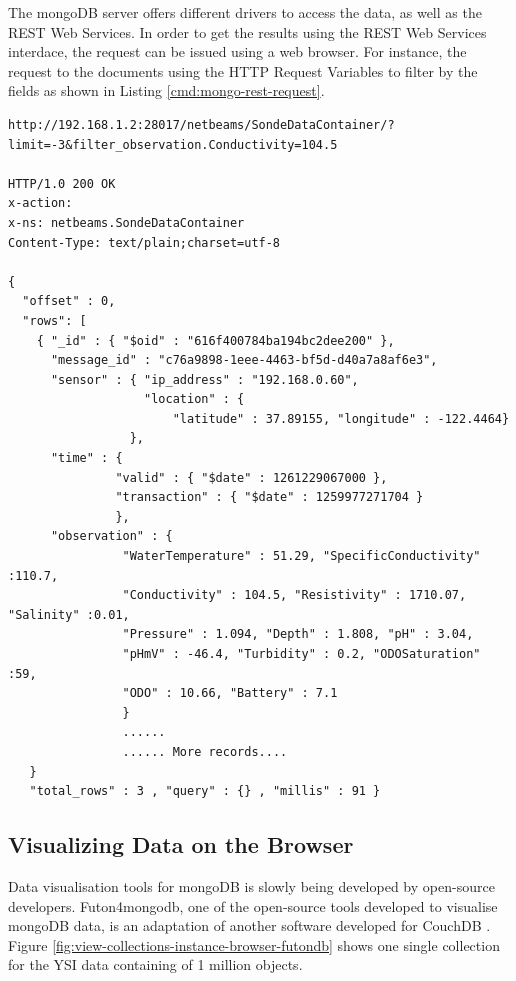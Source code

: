 The mongoDB server offers different drivers to access the data, as well as the
REST Web Services. In order to get the results using the REST Web Services
interdace, the request can be issued using a web browser. For instance, the
request to the documents using the HTTP Request Variables to filter by the
fields as shown in Listing \ref{cmd:mongo-rest-request}.

\lstset{label=cmd:mongo-rest-request,caption=REST HTTP Interface Example}
\begin{lstlisting}
http://192.168.1.2:28017/netbeams/SondeDataContainer/?limit=-3&filter_observation.Conductivity=104.5

HTTP/1.0 200 OK
x-action:
x-ns: netbeams.SondeDataContainer
Content-Type: text/plain;charset=utf-8

{
  "offset" : 0,
  "rows": [
    { "_id" : { "$oid" : "616f400784ba194bc2dee200" }, 
      "message_id" : "c76a9898-1eee-4463-bf5d-d40a7a8af6e3", 
      "sensor" : { "ip_address" : "192.168.0.60", 
                   "location" : {
                       "latitude" : 37.89155, "longitude" : -122.4464} 
                 }, 
      "time" : { 
               "valid" : { "$date" : 1261229067000 },
               "transaction" : { "$date" : 1259977271704 } 
               },
      "observation" : { 
                "WaterTemperature" : 51.29, "SpecificConductivity" :110.7,
                "Conductivity" : 104.5, "Resistivity" : 1710.07, "Salinity" :0.01, 
                "Pressure" : 1.094, "Depth" : 1.808, "pH" : 3.04,
                "pHmV" : -46.4, "Turbidity" : 0.2, "ODOSaturation" :59, 
                "ODO" : 10.66, "Battery" : 7.1 
                } 
                ......
                ...... More records....
   } 
   "total_rows" : 3 , "query" : {} , "millis" : 91 }
\end{lstlisting}

\subsection{Visualizing Data on the Browser}

Data visualisation tools for mongoDB is slowly being developed by open-source
developers. Futon4mongodb, one of the open-source tools developed to visualise
mongoDB data, is an adaptation of another software developed for CouchDB
\cite{couchdb}. Figure \ref{fig:view-collections-instance-browser-futondb}
shows one single collection for the YSI data containing of 1 million objects.

